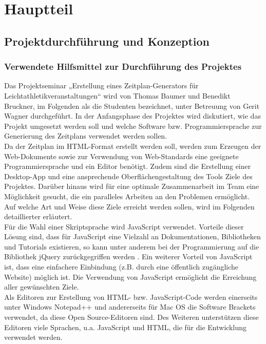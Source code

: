 
\chapter{Hauptteil}
\label{chap:Hauptteil}

\section{Projektdurchführung und Konzeption}

\subsection{Verwendete Hilfsmittel zur Durchführung des Projektes}
Das Projektseminar „Erstellung eines Zeitplan-Generators für Leichtathletikveranstaltungen“ wird von Thomas Baumer und Benedikt Bruckner, im Folgenden als die Studenten bezeichnet, unter Betreuung von Gerit Wagner durchgeführt. In der Anfangsphase des Projektes wird diskutiert, wie das Projekt umgesetzt werden soll und welche Software bzw. Programmiersprache zur Generierung des Zeitplans verwendet werden sollen.\\
Da der Zeitplan im HTML-Format erstellt werden soll, werden zum Erzeugen der Web-Dokumente sowie zur Verwendung von Web-Standards eine geeignete Programmiersprache und ein Editor benötigt. Zudem sind die Erstellung einer Desktop-App und eine ansprechende Oberflächengestaltung des Tools Ziele des Projektes. Darüber hinaus wird für eine optimale Zusammenarbeit im Team eine Möglichkeit gesucht, die ein paralleles Arbeiten an den Problemen ermöglicht. Auf welche Art und Weise diese Ziele erreicht werden sollen, wird im Folgenden detaillierter erläutert.\\
Für die Wahl einer Skriptsprache wird JavaScript verwendet. Vorteile dieser Lösung sind, dass für JavaScript eine Vielzahl an Dokumentationen, Bibliotheken und Tutorials existieren, so kann unter anderem bei der Programmierung auf die Bibliothek jQuery zurückgegriffen werden \cite{w3schools}. Ein weiterer Vorteil von JavaScript ist, dass eine einfachere Einbindung (z.B. durch eine öffentlich zugängliche Website) möglich ist. Die Verwendung von JavaScript ermöglicht die Erreichung aller gewünschten Ziele.\\
Als Editoren zur Erstellung von HTML- bzw. JavaScript-Code werden einerseits unter Windows Notepad++ und andererseits für Mac OS die Software Brackets verwendet, da diese Open Source-Editoren sind. Des Weiteren unterstützen diese Editoren viele Sprachen, u.a. JavaScript und HTML, die für die Entwicklung verwendet werden.\\
